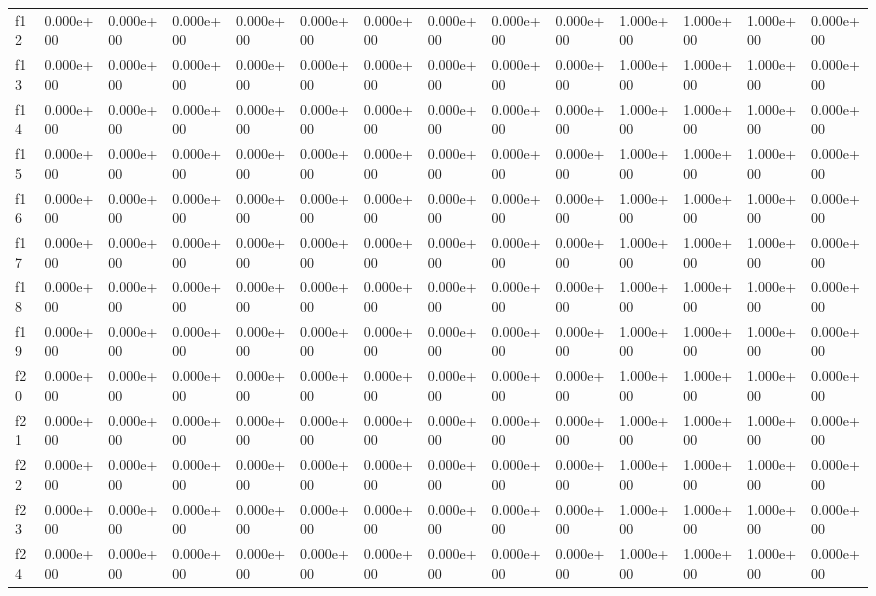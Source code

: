 \begin{table}
\begin{tabular}{llllllllllllll}
f12 & 0.000e+00 & 0.000e+00 & 0.000e+00 & 0.000e+00 & 0.000e+00 & 0.000e+00 & 0.000e+00 & 0.000e+00 & 0.000e+00 & 1.000e+00 & 1.000e+00 & 1.000e+00 & 0.000e+00 \\
f13 & 0.000e+00 & 0.000e+00 & 0.000e+00 & 0.000e+00 & 0.000e+00 & 0.000e+00 & 0.000e+00 & 0.000e+00 & 0.000e+00 & 1.000e+00 & 1.000e+00 & 1.000e+00 & 0.000e+00 \\
f14 & 0.000e+00 & 0.000e+00 & 0.000e+00 & 0.000e+00 & 0.000e+00 & 0.000e+00 & 0.000e+00 & 0.000e+00 & 0.000e+00 & 1.000e+00 & 1.000e+00 & 1.000e+00 & 0.000e+00 \\
f15 & 0.000e+00 & 0.000e+00 & 0.000e+00 & 0.000e+00 & 0.000e+00 & 0.000e+00 & 0.000e+00 & 0.000e+00 & 0.000e+00 & 1.000e+00 & 1.000e+00 & 1.000e+00 & 0.000e+00 \\
f16 & 0.000e+00 & 0.000e+00 & 0.000e+00 & 0.000e+00 & 0.000e+00 & 0.000e+00 & 0.000e+00 & 0.000e+00 & 0.000e+00 & 1.000e+00 & 1.000e+00 & 1.000e+00 & 0.000e+00 \\
f17 & 0.000e+00 & 0.000e+00 & 0.000e+00 & 0.000e+00 & 0.000e+00 & 0.000e+00 & 0.000e+00 & 0.000e+00 & 0.000e+00 & 1.000e+00 & 1.000e+00 & 1.000e+00 & 0.000e+00 \\
f18 & 0.000e+00 & 0.000e+00 & 0.000e+00 & 0.000e+00 & 0.000e+00 & 0.000e+00 & 0.000e+00 & 0.000e+00 & 0.000e+00 & 1.000e+00 & 1.000e+00 & 1.000e+00 & 0.000e+00 \\
f19 & 0.000e+00 & 0.000e+00 & 0.000e+00 & 0.000e+00 & 0.000e+00 & 0.000e+00 & 0.000e+00 & 0.000e+00 & 0.000e+00 & 1.000e+00 & 1.000e+00 & 1.000e+00 & 0.000e+00 \\
f20 & 0.000e+00 & 0.000e+00 & 0.000e+00 & 0.000e+00 & 0.000e+00 & 0.000e+00 & 0.000e+00 & 0.000e+00 & 0.000e+00 & 1.000e+00 & 1.000e+00 & 1.000e+00 & 0.000e+00 \\
f21 & 0.000e+00 & 0.000e+00 & 0.000e+00 & 0.000e+00 & 0.000e+00 & 0.000e+00 & 0.000e+00 & 0.000e+00 & 0.000e+00 & 1.000e+00 & 1.000e+00 & 1.000e+00 & 0.000e+00 \\
f22 & 0.000e+00 & 0.000e+00 & 0.000e+00 & 0.000e+00 & 0.000e+00 & 0.000e+00 & 0.000e+00 & 0.000e+00 & 0.000e+00 & 1.000e+00 & 1.000e+00 & 1.000e+00 & 0.000e+00 \\
f23 & 0.000e+00 & 0.000e+00 & 0.000e+00 & 0.000e+00 & 0.000e+00 & 0.000e+00 & 0.000e+00 & 0.000e+00 & 0.000e+00 & 1.000e+00 & 1.000e+00 & 1.000e+00 & 0.000e+00 \\
f24 & 0.000e+00 & 0.000e+00 & 0.000e+00 & 0.000e+00 & 0.000e+00 & 0.000e+00 & 0.000e+00 & 0.000e+00 & 0.000e+00 & 1.000e+00 & 1.000e+00 & 1.000e+00 & 0.000e+00 \\

\end{tabular}
\end{table}
